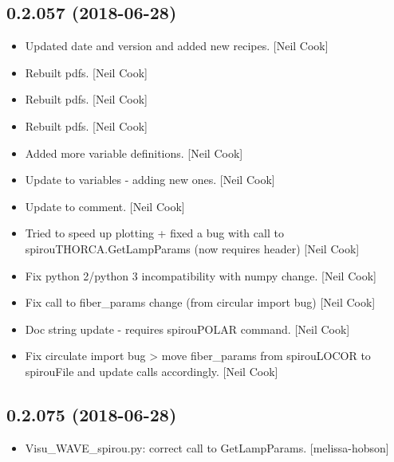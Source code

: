 \documentclass[a4paper,10pt,english]{report}
\begin{document}
\subsection{0.2.057 (2018-06-28)}
\label{\detokenize{misc/changelog:id405}}\begin{itemize}
\item {} 
Updated date and version and added new recipes. {[}Neil Cook{]}

\item {} 
Rebuilt pdfs. {[}Neil Cook{]}

\item {} 
Rebuilt pdfs. {[}Neil Cook{]}

\item {} 
Rebuilt pdfs. {[}Neil Cook{]}

\item {} 
Added more variable definitions. {[}Neil Cook{]}

\item {} 
Update to variables - adding new ones. {[}Neil Cook{]}

\item {} 
Update to comment. {[}Neil Cook{]}

\item {} 
Tried to speed up plotting + fixed a bug with call to
spirouTHORCA.GetLampParams (now requires header) {[}Neil Cook{]}

\item {} 
Fix python 2/python 3 incompatibility with numpy change. {[}Neil Cook{]}

\item {} 
Fix call to fiber\_params change (from circular import bug) {[}Neil Cook{]}

\item {} 
Doc string update - requires spirouPOLAR command. {[}Neil Cook{]}

\item {} 
Fix circulate import bug \textendash{}\textgreater{} move fiber\_params from spirouLOCOR to
spirouFile and update calls accordingly. {[}Neil Cook{]}

\end{itemize}


\subsection{0.2.075 (2018-06-28)}
\label{\detokenize{misc/changelog:id406}}\begin{itemize}
\item {} 
Visu\_WAVE\_spirou.py: correct call to GetLampParams. {[}melissa-hobson{]}

\end{itemize}
\end{document}
